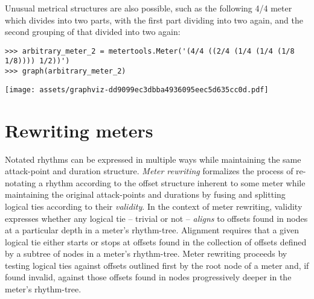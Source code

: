 \noindent Unusual metrical structures are also possible, such as the following
4/4 meter which divides into two parts, with the first part dividing into two
again, and the second grouping of that divided into two again:

\begin{comment}
<abjad>
arbitrary_meter_2 = metertools.Meter('(4/4 ((2/4 (1/4 (1/4 (1/8 1/8)))) 1/2))')
graph(arbitrary_meter_2)
</abjad>
\end{comment}

\begin{abjadbookoutput}
\begin{singlespacing}
\vspace{-0.5\baselineskip}
\begin{lstlisting}
>>> arbitrary_meter_2 = metertools.Meter('(4/4 ((2/4 (1/4 (1/4 (1/8 1/8)))) 1/2))')
>>> graph(arbitrary_meter_2)
\end{lstlisting}
\noindent\texttt{[image: assets/graphviz-dd9099ec3dbba4936095eec5d635cc0d.pdf]}
\end{singlespacing}
\end{abjadbookoutput}

\section{Rewriting meters}
\label{sec:rewriting-meters}


Notated rhythms can be expressed in multiple ways while maintaining the same
attack-point and duration structure. \emph{Meter rewriting} formalizes the
process of re-notating a rhythm according to the offset structure inherent to
some meter while maintaining the original attack-points and durations by fusing
and splitting logical ties according to their \emph{validity}. In the context
of meter rewriting, validity expresses whether any logical tie -- trivial or
not -- \emph{aligns} to offsets found in nodes at a particular depth in a
meter's rhythm-tree. Alignment requires that a given logical tie either starts
or stops at offsets found in the collection of offsets defined by a subtree of
nodes in a meter's rhythm-tree. Meter rewriting proceeds by testing logical
ties against offsets outlined first by the root node of a meter and, if found
invalid, against those offsets found in nodes progressively deeper in the
meter's rhythm-tree.

